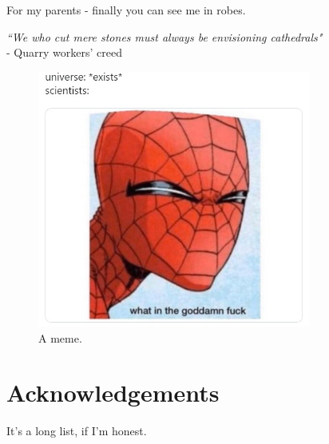 \newpage
\noindent\large{For my parents - finally you can see me in robes.}\newline
\mbox{}
\vfill
\begin{flushright}
\large{\emph{``We who cut mere stones must always be envisioning cathedrals"\\} 
- Quarry workers' creed}
\end{flushright}


\newpage
\thispagestyle{empty}
\vspace{7cm}
\begin{figure}
\centering
\includegraphics[width=0.8\textwidth]{fig/misc/spidey.jpeg}
\caption{A meme.}
\end{figure}

\vfill
\section*{Acknowledgements}

It's a long list, if I'm honest.

\newpage

